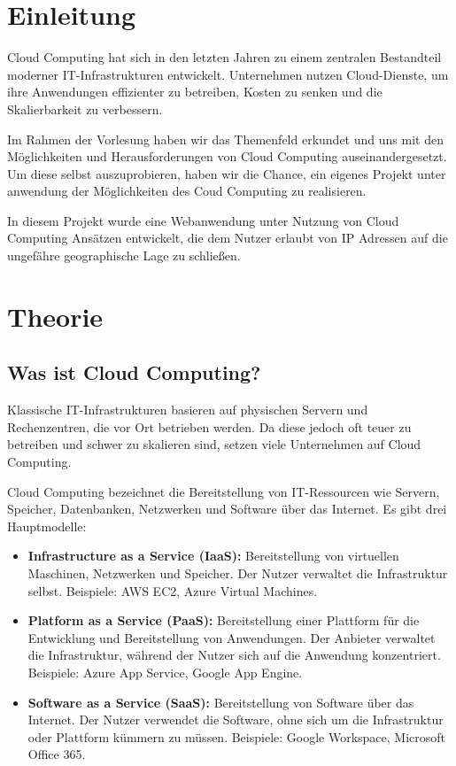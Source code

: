 \chapter{Einleitung}
Cloud Computing hat sich in den letzten Jahren zu einem zentralen Bestandteil moderner IT-Infrastrukturen entwickelt. Unternehmen nutzen Cloud-Dienste, um ihre Anwendungen effizienter zu betreiben, Kosten zu senken und die Skalierbarkeit zu verbessern. 

Im Rahmen der Vorlesung haben wir das Themenfeld erkundet und uns mit den Möglichkeiten und Herausforderungen von Cloud Computing auseinandergesetzt. Um diese selbst auszuprobieren, haben wir die Chance, ein eigenes Projekt unter anwendung der Möglichkeiten des Coud Computing zu realisieren.

In diesem Projekt wurde eine Webanwendung unter Nutzung von Cloud Computing Ansätzen entwickelt, die dem Nutzer erlaubt von IP Adressen auf die ungefähre geographische Lage zu schließen.

\chapter{Theorie}
\section{Was ist Cloud Computing?}
Klassische IT-Infrastrukturen basieren auf physischen Servern und Rechenzentren, die vor Ort betrieben werden. Da diese jedoch oft teuer zu betreiben und schwer zu skalieren sind, setzen viele Unternehmen auf Cloud Computing.

Cloud Computing bezeichnet die Bereitstellung von IT-Ressourcen wie Servern, Speicher, Datenbanken, Netzwerken und Software über das Internet. Es gibt drei Hauptmodelle\cite{mell2011nist,hurwitz2010cloud,zhang2010towards}:
\begin{itemize}
    \item \textbf{Infrastructure as a Service (IaaS):} Bereitstellung von virtuellen Maschinen, Netzwerken und Speicher. Der Nutzer verwaltet die Infrastruktur selbst. Beispiele: AWS EC2, Azure Virtual Machines.
    \item \textbf{Platform as a Service (PaaS):} Bereitstellung einer Plattform für die Entwicklung und Bereitstellung von Anwendungen. Der Anbieter verwaltet die Infrastruktur, während der Nutzer sich auf die Anwendung konzentriert. Beispiele: Azure App Service, Google App Engine.
    \item \textbf{Software as a Service (SaaS):} Bereitstellung von Software über das Internet. Der Nutzer verwendet die Software, ohne sich um die Infrastruktur oder Plattform kümmern zu müssen. Beispiele: Google Workspace, Microsoft Office 365.
\end{itemize}

